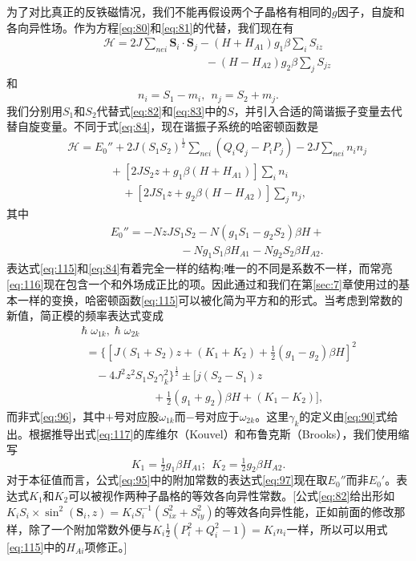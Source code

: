 \documentclass{article}
\begin{document}
为了对比真正的反铁磁情况，我们不能再假设两个子晶格有相同的$g$因子，自旋和各向异性场。作为方程\eqref{eq:80}和\eqref{eq:81}的代替，我们现在有
\begin{eqnarray} \label{eq:113}
&&\mathcal{H}=2J\sum\nolimits_{\mathit{nei}}\mathbf{S}_i\cdot\mathbf{S}_j-(H+H_{A1})g_1\beta\sum\nolimits_iS_{iz}\nonumber\\
&&~~~~~~~~~~~~~~~~~~~~~~~~~~~~~~~~~~~~~~~~~-(H-H_{A2})g_2\beta\sum\nolimits_jS_{jz}
\end{eqnarray}
和
\begin{equation} \label{eq:114}
n_i=S_1-m_i,~~n_j=S_2+m_j.
\end{equation} 
我们分别用$S_1$和$S_2$代替式\eqref{eq:82}和\eqref{eq:83}中的$S$，并引入合适的简谐振子变量去代替自旋变量。不同于式\eqref{eq:84}，现在谐振子系统的哈密顿函数是
\begin{eqnarray} \label{eq:115}
&&\mathcal{H}=E_0''+2J(S_1S_2)^\frac{1}{2}\sum\nolimits_{\mathit{nei}}(Q_iQ_j-P_iP_j)-2J\sum\nolimits_\mathit{nei}n_in_j\nonumber\\
&&~~~~~~~~~~~~~~~~~+[2JS_2z+g_1\beta(H+H_{A1})]\sum\nolimits_in_i\nonumber\\
&&~~~~~~~~~~~~~~~~~~~~~~+[2JS_1z+g_2\beta(H-H_{A2})]\sum\nolimits_jn_j,
\end{eqnarray}
其中
\begin{eqnarray} \label{eq:116}
&&E_0''=-NzJS_1S_2-N(g_1S_1-g_2S_2)\beta H+\nonumber\\
&&~~~~~~~~~~~~~~~~~~~~~~~~~~~~-Ng_1S_1\beta H_{A1}-Ng_2S_2\beta H_{A2}.
\end{eqnarray}
表达式\eqref{eq:115}和\eqref{eq:84}有着完全一样的结构;唯一的不同是系数不一样，而常亮\eqref{eq:116}现在包含一个和外场成正比的项。因此通过和我们在第\ref{sec:7}章使用过的基本一样的变换，哈密顿函数\eqref{eq:115}可以被化简为平方和的形式。当考虑到常数的新值，简正模的频率表达式变成
\begin{eqnarray} \label{eq:117}
&&\hslash\omega_{1k},\hslash\omega_{2k}\nonumber\\
&&~~~=\{[J(S_1+S_2)z+(K_1+K_2)+\tfrac{1}{2}(g_1-g_2)\beta H]^2\nonumber\\
&&~~~~~~~-4J^2z^2S_1S_2\gamma_k^2\}^\frac{1}{2}\pm[j(S_2-S_1)z\nonumber\\
&&~~~~~~~~~~~~~~~~~~~~~~~~~~~~~~+\tfrac{1}{2}(g_1+g_2)\beta H+(K_1-K_2)],
\end{eqnarray}
而非式\eqref{eq:96}，其中$+$号对应股$\omega_{1k}$而$-$号对应于$\omega_{2k}$。这里$\gamma_k$的定义由\eqref{eq:90}式给出。根据推导出式\eqref{eq:117}的库维尔（Kouvel）和布鲁克斯（Brooks），我们使用缩写
\begin{equation} \label{eq:118}
K_1=\tfrac{1}{2}g_1\beta H_{A1};~~K_2=\tfrac{1}{2}g_2\beta H_{A2}.
\end{equation}
对于本征值而言，公式\eqref{eq:95}中的附加常数的表达式\eqref{eq:97}现在取$E_0''$而非$E_0'$。表达式$K_1$和$K_2$可以被视作两种子晶格的等效各向异性常数。[公式\eqref{eq:82}给出形如$K_iS_i\times\sin^2(\mathbf{S}_i,z)=K_iS_i^{-1}(S_{ix}^2+S_{iy}^2)$的等效各向异性能，正如前面的修改那样，除了一个附加常数外便与$K_i\tfrac{1}{2}(P_i^2+Q_i^2-1)=K_in_i$一样，所以可以用式\eqref{eq:115}中的$H_{Ai}$项修正。]
\end{document}

